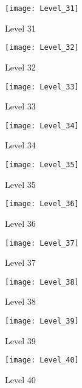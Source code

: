 \clearpage

\begin{figure}
  \centering \texttt{[image: Level\_31]} \caption{Level
    31} \label{fig:level31-pic} \end{figure}
\begin{figure}
  \centering \texttt{[image: Level\_32]} \caption{Level
    32} \label{fig:level32-pic} \end{figure}
\begin{figure}
  \centering \texttt{[image: Level\_33]} \caption{Level
    33} \label{fig:level33-pic} \end{figure}
\begin{figure}
  \centering \texttt{[image: Level\_34]} \caption{Level
    34} \label{fig:level34-pic} \end{figure}
\begin{figure}
  \centering \texttt{[image: Level\_35]} \caption{Level
    35} \label{fig:level35-pic} \end{figure}
\begin{figure}
  \centering \texttt{[image: Level\_36]} \caption{Level
    36} \label{fig:level36-pic} \end{figure}
\begin{figure}
  \centering \texttt{[image: Level\_37]} \caption{Level
    37} \label{fig:level37-pic} \end{figure}
\begin{figure}
  \centering \texttt{[image: Level\_38]} \caption{Level
    38} \label{fig:level38-pic} \end{figure}
\begin{figure}
  \centering \texttt{[image: Level\_39]} \caption{Level
    39} \label{fig:level39-pic} \end{figure}
\begin{figure}
  \centering \texttt{[image: Level\_40]} \caption{Level
    40} \label{fig:level40-pic} \end{figure}
